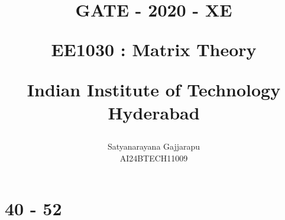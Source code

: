 \documentclass[journal]{IEEEtran}
\begin{document}

\vspace{3cm}




\title{
GATE - 2020 - XE

\large{EE1030 : Matrix Theory}

Indian Institute of Technology Hyderabad
}
\author{Satyanarayana Gajjarapu

AI24BTECH11009
}	





\maketitle




\bigskip

\renewcommand{\thefigure}{\theenumi}
\renewcommand{\thetable}{\theenumi}


\section{40 - 52}
\end{document}
